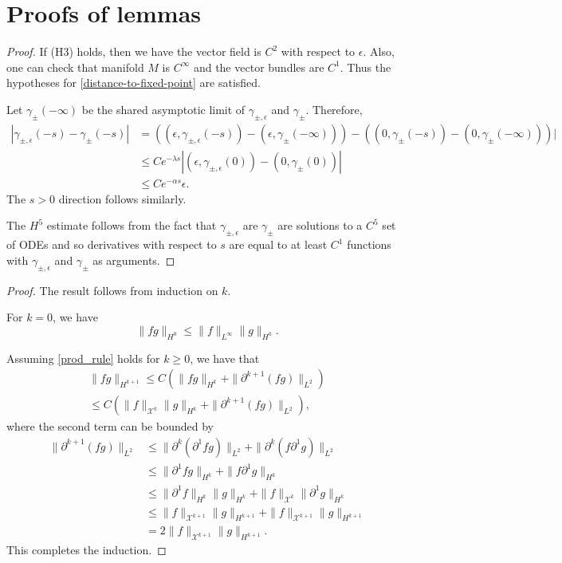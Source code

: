 \chapter{Proofs of lemmas}\label{lemma-appendix}
\heteroclinicorbitsobolev*
\begin{proof}
	 If (H3) holds, then we have the vector field is \(C^2\) with respect to \(\epsilon\). Also, one can check that manifold \(M\) is \(C^\infty\) and the vector bundles are \(C^1\). Thus the hypotheses for \cref{distance-to-fixed-point} are satisfied.
	 
	 Let \(\gamma_\pm(-\infty)\) be the shared asymptotic limit of \(\gamma_{\pm, \epsilon}\) and \(\gamma_\pm\). Therefore,
	 \begin{align*}
	 	|\gamma_{\pm, \epsilon}(-s) - \gamma_\pm(-s)| &=((\epsilon, \gamma_{\pm,\epsilon}(-s)) - (\epsilon, \gamma_\pm(-\infty)) )- ((0, \gamma_{\pm}(-s)) - (0, \gamma_\pm(-\infty)))| \\
	 	&\leq C e^{-\lambda s} |(\epsilon, \gamma_{\pm,\epsilon}(0)) - (0,\gamma_\pm(0)) | \\
	 	&\leq C e^{-\alpha s} \epsilon .
	 \end{align*}
 	The \(s> 0\) direction follows similarly. 
 	
 	The \(H^5\) estimate follows from the fact that \(\gamma_{\pm,\epsilon}\) are \(\gamma_{\pm}\) are solutions to a \(C^5\) set of ODEs and so derivatives with respect to \(s\) are equal to at least \(C^1\) functions with \(\gamma_{\pm, \epsilon}\) and \(\gamma_{\pm}\) as arguments.
\end{proof}

\prodruleone*
\begin{proof}
	The result follows from induction on \(k\).
	
	For \(k = 0\), we have
	\begin{equation}
		\| f g \|_{H^0} \leq \| f \|_{L^\infty} \| g\|_{H^0}.
	\end{equation}
	
	Assuming \cref{prod_rule} holds for \(k\geq 0\), we have that 
	\begin{align*}
		\| f g \|_{H^{k+1}} \leq C \left( \| f g \|_{H^k} + \| \partial^{k+1}(fg) \|_{L^2}\right) \\
		\leq C \left( \| f\|_{\mathcal X^k} \| g \|_{H^k} + \| \partial^{k+1}(fg) \|_{L^2} \right),
	\end{align*}
	where the second term can be bounded by 
	\begin{align*}
		\| \partial^{k+1}(fg) \|_{L^2} &\leq \| \partial^k(\partial^1 f g ) \|_{L^2} + \| \partial^k(f \partial^1 g) \|_{L^2} \\
		&\leq \| \partial^1 f  g \|_{H^k} + \| f \partial^1 g \|_{H^k} \\
		&\leq \| \partial^1 f \|_{H^k} \|g\|_{H^k} + \|f\|_{\mathcal X^k} \|\partial^1 g\|_{H^k} \\
		&\leq \| f \|_{\mathcal X^{k+1}} \| g\|_{H^{k+1}} + \|f \|_{\mathcal X^{k+1}} \|g\|_{H^{k+1}} \\
		&= 2  \| f \|_{\mathcal X^{k+1}} \| g\|_{H^{k+1}}.
	\end{align*}
	This completes the induction.
\end{proof}

